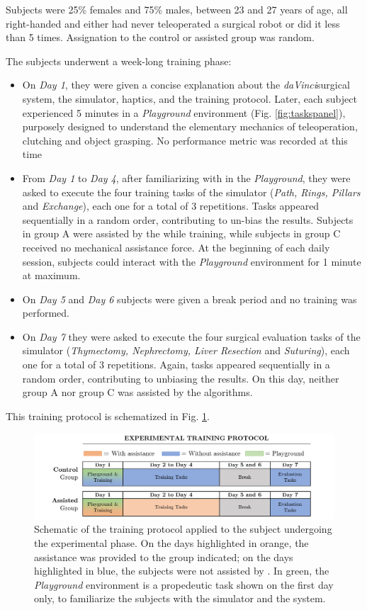 \documentclass[../main.tex]{subfiles}
\begin{document}
Subjects were 25\% females and 75\% males, between 23 and 27 years of age, all right-handed and either had never teleoperated a surgical robot or did it less than 5 times. Assignation to the control or assisted group was random.

The subjects underwent a week-long training phase:
\begin{itemize}
  \item On \textit{Day 1}, they were given a concise explanation about the \textit{daVinci}\cright surgical system, the simulator, haptics, and the training protocol. Later, each subject experienced 5 minutes in a \textit{Playground} environment (Fig. \ref{fig:taskspanel}), purposely designed to understand the elementary mechanics of teleoperation, clutching and object grasping. No performance metric was recorded at this time
  \item From \textit{Day 1} to \textit{Day 4}, after familiarizing with in the \textit{Playground}, they were asked to execute the four training tasks of the simulator (\textit{Path, Rings, Pillars} and \textit{Exchange}), each one for a total of 3 repetitions. Tasks appeared sequentially in a random order, contributing to un-bias the results. Subjects in group A were assisted by the \vfs while training, while subjects in group C received no mechanical assistance force. At the beginning of each daily session, subjects could interact with the \textit{Playground} environment for 1 minute at maximum.  
  \item On \textit{Day 5} and \textit{Day 6} subjects were given a break period and no training was performed.
  \item On \textit{Day 7} they were asked to execute the four surgical evaluation tasks of the simulator (\textit{Thymectomy, Nephrectomy, Liver Resection} and \textit{Suturing}), each one for a total of 3 repetitions. Again, tasks appeared sequentially in a random order, contributing to unbiasing the results. On this day, neither group A nor group C was assisted by the \vf algorithms.
\end{itemize}
This training protocol is schematized in Fig. \ref{fig:trainingprotocol}.
\begin{figure}
    \centering
    \includegraphics[width=\textwidth]{images/training_protocol.png}
    \caption{Schematic of the training protocol applied to the subject undergoing the experimental phase. On the days highlighted in orange, the \vf assistance was provided to the group indicated; on the days highlighted in blue, the subjects were not assisted by \vfs. In green, the \textit{Playground} environment is a propedeutic task shown on the first day only, to familiarize the subjects with the simulator and the \davinci system.}
    \label{fig:trainingprotocol}
\end{figure}
\end{document}
